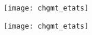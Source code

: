 \documentclass[12pt,a4paper]{article}
\begin{document}
	
\graphicspath{{./img/}}	
%
%
%
%

	\begin{center}
		\texttt{[image: chgmt\_etats]}
	\end{center}


	\begin{center}
	\texttt{[image: chgmt\_etats]}
\end{center}

\appendix

\end{document}
